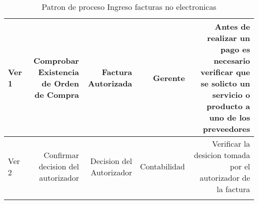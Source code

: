 \begin{longtable}{|llrrrrrr|}
	\multicolumn{2}{|m{3cm}|}{Ver 1} & \multicolumn{1}{m{2cm}|}{Comprobar Existencia de Orden de Compra} & \multicolumn{1}{m{2.2cm}|}{Factura Autorizada} & \multicolumn{1}{m{2cm}|}{Gerente} & \multicolumn{3}{m{4cm}|}{Antes de realizar un pago es necesario verificar que se solicto un servicio o producto a uno de los preveedores} \\ \hline
	\multicolumn{2}{|m{3cm}|}{ Ver 2} & \multicolumn{1}{m{2cm}|}{Confirmar decision del autorizador} & \multicolumn{1}{m{2.2cm}|}{Decision del Autorizador} & \multicolumn{1}{m{1.5cm}|}{Contabilidad} & \multicolumn{3}{m{4cm}|}{Verificar la desicion tomada por el autorizador de la factura} \\ \hline		
    \caption{Patron de proceso Ingreso facturas no electronicas}
\end{longtable}

